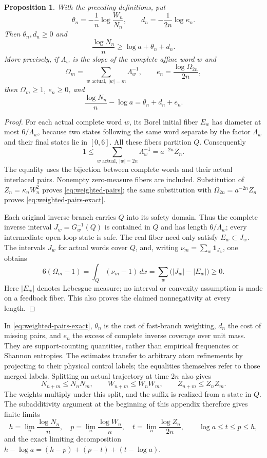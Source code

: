 \documentclass[11pt,reqno]{amsart}
\numberwithin{equation}{section}
\newtheorem{proposition}[theorem]{Proposition}
\theoremstyle{definition}
\theoremstyle{definition}
\newcommand{\one}{\mathbf 1}
\begin{document}
\begin{proposition}\label{prop:weighted-pairs}
With the preceding definitions, put
\[
 \theta_n=-\frac1n\log\frac{W_n}{N_n},\qquad
 d_n=-\frac1{2n}\log\kappa_n.
\]
Then $\theta_n,d_n\ge0$ and
\begin{equation}\label{eq:weighted-pairs}
 \frac{\log N_n}{n}\ge\log a+\theta_n+d_n.
\end{equation}
More precisely, if $\Lambda_w$ is the slope of the complete
affine word $w$ and
\[
 \Omega_m=\sum_{w\text{ actual},\ |w|=m}\Lambda_w^{-1},
 \qquad e_n=\frac{\log\Omega_{2n}}{2n},
\]
then $\Omega_m\ge1$, $e_n\ge0$, and
\begin{equation}\label{eq:weighted-pairs-exact}
 \frac{\log N_n}{n}-\log a=\theta_n+d_n+e_n.
\end{equation}
\end{proposition}
\begin{proof}
For each actual complete word $w$, its Borel initial fiber
$E_w$ has diameter at most $6/\Lambda_w$, because two states
following the same word separate by the factor $\Lambda_w$
and their final states lie in $[0,6]$. All these fibers partition
$Q$. Consequently
\[
 1\le\sum_{w\text{ actual},\ |w|=2n}\Lambda_w^{-1}
       =a^{-2n}Z_n.
\]
The equality uses the bijection between complete words and their
actual interlaced pairs. Nonempty zero-measure fibers are included.
Substitution of $Z_n=\kappa_nW_n^2$ proves
\eqref{eq:weighted-pairs}; the same substitution with
$\Omega_{2n}=a^{-2n}Z_n$ proves
\eqref{eq:weighted-pairs-exact}.

Each original inverse branch carries $Q$ into its safety domain.
Thus the complete inverse interval $J_w=G_w^{-1}(Q)$ is contained
in $Q$ and has length $6/\Lambda_w$; every intermediate open-loop
state is safe. The real fiber need only satisfy $E_w\subset J_w$.
The intervals $J_w$ for actual words cover $Q$, and, writing
$\nu_m=\sum_w\one_{J_w}$, one obtains
\[
 6(\Omega_m-1)=\int_Q(\nu_m-1)\,dx
              =\sum_w\bigl(|J_w|-|E_w|\bigr)\ge0.
\]
Here $|E_w|$ denotes Lebesgue measure; no interval or convexity
assumption is made on a feedback fiber. This also proves the
claimed nonnegativity at every length.
\end{proof}

In \eqref{eq:weighted-pairs-exact}, $\theta_n$ is the cost of
fast-branch weighting, $d_n$ the cost of missing pairs, and $e_n$
the excess of complete inverse coverage over unit mass. They are
support-counting quantities, rather than empirical frequencies
or Shannon entropies. The estimates transfer to arbitrary atom
refinements by projecting to their physical control labels;
the equalities themselves refer to those merged labels.
Splitting an actual trajectory at time $2n$ also gives
\[
 N_{n+m}\le N_nN_m,\qquad W_{n+m}\le W_nW_m,
 \qquad Z_{n+m}\le Z_nZ_m.
\]
The weights multiply under this split, and the suffix is realized
from a state in $Q$. The subadditivity argument at the beginning
of this appendix therefore gives finite limits
\[
 h=\lim_n\frac{\log N_n}{n},\quad
 p=\lim_n\frac{\log W_n}{n},\quad
 t=\lim_n\frac{\log Z_n}{2n},\qquad
 \log a\le t\le p\le h,
\]
and the exact limiting decomposition
$h-\log a=(h-p)+(p-t)+(t-\log a)$.
\end{document}
